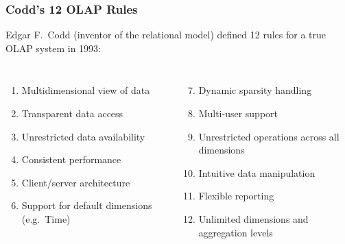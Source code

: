 \begin{frame}
  \frametitle{Codd's 12 OLAP Rules}

  Edgar F.\ Codd (inventor of the relational model) defined 12 rules
  for a true OLAP system in 1993:

  \begin{columns}[T]
    \begin{enumerate}
      \item Multidimensional view of data
      \item Transparent data access
      \item Unrestricted data availability
      \item Consistent performance
      \item Client/server architecture
      \item Support for default dimensions (e.g.\ Time)
    \end{enumerate}

    \begin{enumerate}
      \setcounter{enumi}{6}
      \item Dynamic sparsity handling
      \item Multi-user support
      \item Unrestricted operations across all dimensions
      \item Intuitive data manipulation
      \item Flexible reporting
      \item Unlimited dimensions and aggregation levels
    \end{enumerate}
  \end{columns}
\end{frame}


